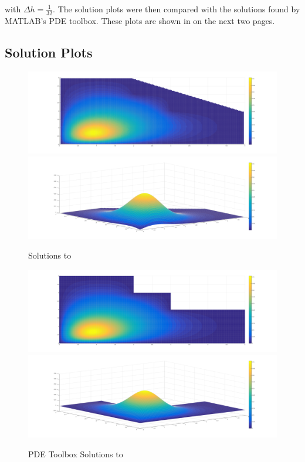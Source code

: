 \documentclass[10pt,a4paper]{article}
\begin{document}
with $\Delta h = \frac{1}{32}$. The solution plots were then compared with the solutions found by MATLAB's PDE toolbox. These plots are shown in  on the next two pages.


\pagebreak
\subsection*{Solution Plots}

\begin{figure}[H]
\includegraphics[width=\linewidth]{figures/gaussian-top.png}
\includegraphics[width=\linewidth]{figures/gaussian-iso.png}
\caption{Solutions to }
\label{fig: gaussian solutions}
\end{figure}

\begin{figure}[H]
\includegraphics[width=\linewidth]{figures/gaussian-top-pdetool.png}
\includegraphics[width=\linewidth]{figures/gaussian-iso-pdetool.png}
\caption{PDE Toolbox Solutions to }
\label{fig: pdetool gaussian solutions}
\end{figure}
\end{document}
